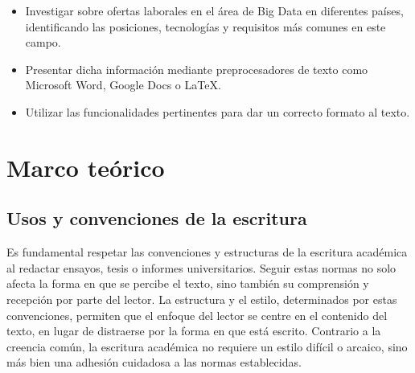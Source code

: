 \documentclass[12pt]{article}
\begin{document}
            \begin{itemize}[label=$\bullet$] 
                \item Investigar sobre ofertas laborales en el área de Big Data en diferentes países, identificando las posiciones, tecnologías y requisitos más comunes en este campo.
                \item Presentar dicha información mediante preprocesadores de texto como Microsoft Word, Google Docs o LaTeX.
                \item Utilizar las funcionalidades pertinentes para dar un correcto formato al texto.
            \end{itemize}
    
            
    \newpage


    \section{Marco teórico}
        
        \subsection{Usos y convenciones de la escritura}

            Es fundamental respetar las convenciones y estructuras de la escritura académica al redactar ensayos, tesis o informes universitarios. Seguir estas normas no solo afecta la forma en que se percibe el texto, sino también su comprensión y recepción por parte del lector. La estructura y el estilo, determinados por estas convenciones, permiten que el enfoque del lector se centre en el contenido del texto, en lugar de distraerse por la forma en que está escrito. Contrario a la creencia común, la escritura académica no requiere un estilo difícil o arcaico, sino más bien una adhesión cuidadosa a las normas establecidas.
\end{document}
